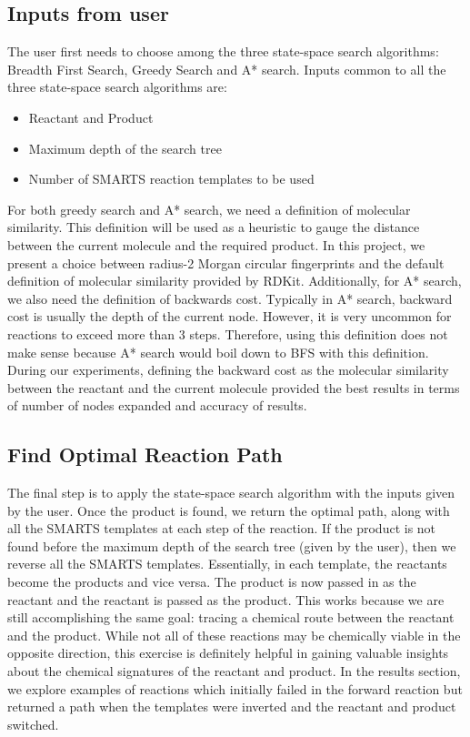 \documentclass[preprint,12pt]{elsarticle}
\begin{document}
\subsection{Inputs from user}
The user first needs to choose among the three state-space search algorithms: Breadth First Search, Greedy Search and A* search.
Inputs common to all the three state-space search algorithms are:
\begin{itemize}
  \item Reactant and Product
  \item Maximum depth of the search tree
  \item Number of SMARTS reaction templates to be used 
\end{itemize}
For both greedy search and A* search, we need a definition of molecular similarity. This definition will be used as a heuristic to gauge the distance between the current molecule and the required product. In this project, we present a choice between radius-2 Morgan circular fingerprints and the default definition of molecular similarity provided by RDKit. 
Additionally, for A* search, we also need the definition of backwards cost. Typically in A* search, backward cost is usually the depth of the current node. However, it is very uncommon for reactions to exceed more than 3 steps. Therefore, using this definition does not make sense because A* search would boil down to BFS with this definition. During our experiments, defining the backward cost as the molecular similarity between the reactant and the current molecule provided the best results in terms of number of nodes expanded and accuracy of results. 

\subsection{Find Optimal Reaction Path}
The final step is to apply the state-space search algorithm with the inputs given by the user. Once the product is found, we return the optimal path, along with all the SMARTS templates at each step of the reaction. If the product is not found before the maximum depth of the search tree (given by the user), then we reverse all the SMARTS templates. Essentially, in each template, the reactants become the products and vice versa. The product is now passed in as the reactant and the reactant is passed as the product. This works because we are still accomplishing the same goal: tracing a chemical route between the reactant and the product. While not all of these reactions may be chemically viable in the opposite direction, this exercise is definitely helpful in gaining valuable insights about the chemical signatures of the reactant and product. In the results section, we explore examples of reactions which initially failed in the forward reaction but returned a path when the templates were inverted and the reactant and product switched. 
\end{document}
